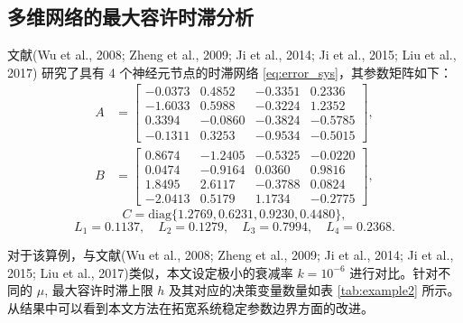 \documentclass[a4paper, 12pt, oneside]{article}
\theoremstyle{cn_theorem}
\begin{document}
\subsection{多维网络的最大容许时滞分析}
文献(Wu et al., 2008; Zheng et al., 2009; Ji et al., 2014; Ji et al., 2015; Liu et al., 2017) 研究了具有 4 个神经元节点的时滞网络 \eqref{eq:error_sys}，其参数矩阵如下：
\begin{align*}
    A &= \begin{bmatrix}
        -0.0373 &  0.4852 & -0.3351 &  0.2336 \\
        -1.6033 &  0.5988 & -0.3224 &  1.2352 \\
         0.3394 & -0.0860 & -0.3824 & -0.5785 \\
        -0.1311 &  0.3253 & -0.9534 & -0.5015
    \end{bmatrix}, \\
    B &= \begin{bmatrix}
         0.8674 & -1.2405 & -0.5325 & -0.0220 \\
         0.0474 & -0.9164 &  0.0360 &  0.9816 \\
         1.8495 &  2.6117 & -0.3788 &  0.0824 \\
        -2.0413 &  0.5179 &  1.1734 & -0.2775
    \end{bmatrix},
\end{align*}
\begin{equation*}
    C = \mathrm{diag}\{1.2769, 0.6231, 0.9230, 0.4480\},
\end{equation*}
\begin{equation*}
    L_1 = 0.1137, \quad L_2 = 0.1279, \quad L_3 = 0.7994, \quad L_4 = 0.2368.
\end{equation*}

对于该算例，与文献(Wu et al., 2008; Zheng et al., 2009; Ji et al., 2014; Ji et al., 2015; Liu et al., 2017)类似，本文设定极小的衰减率 $k=10^{-6}$ 进行对比。针对不同的 $\mu$, 最大容许时滞上限 $h$ 及其对应的决策变量数量如表 \ref{tab:example2} 所示。从结果中可以看到本文方法在拓宽系统稳定参数边界方面的改进。
\end{document}

